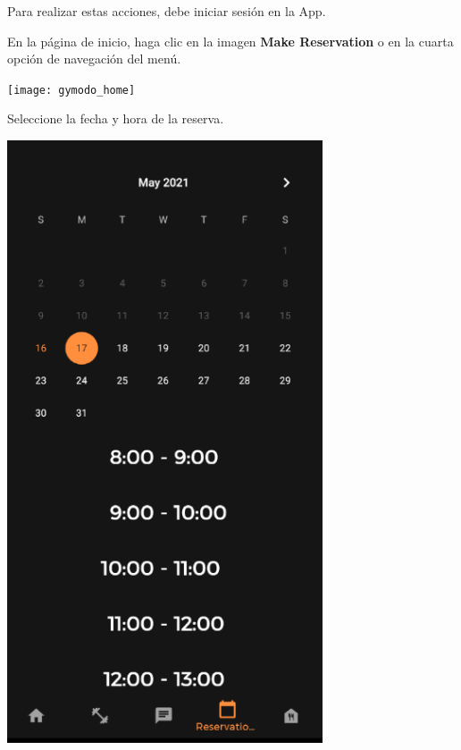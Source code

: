\documentclass[12pt,a4paper]{article}
\begin{document}
\begin{enumerate}
\item Para realizar estas acciones, debe iniciar sesión en la App.

\begin{minipage}{.60\textwidth}
  \item En la página de inicio, haga clic en la imagen \textbf{Make Reservation} o en la cuarta opción de navegación del menú.
\end{minipage}
\begin{minipage}{.40\textwidth}
  \texttt{[image: gymodo\_home]}
\end{minipage}

\begin{minipage}{.60\textwidth}
  \item Seleccione la fecha y hora de la reserva.
\end{minipage}
\begin{minipage}{.40\textwidth}
  \includegraphics[width=0.7\textwidth, right]{selecionareserva}
\end{minipage}


\end{enumerate}
\end{document}
